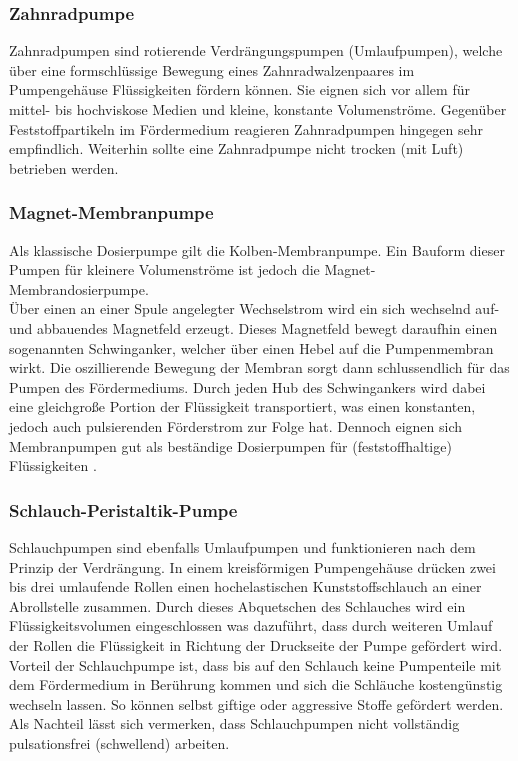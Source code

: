 \subsubsection*{Zahnradpumpe}
Zahnradpumpen sind rotierende Verdrängungspumpen (Umlaufpumpen), welche über eine formschlüssige Bewegung eines Zahnradwalzenpaares im Pumpengehäuse Flüssigkeiten fördern können. Sie eignen sich vor allem für mittel- bis hochviskose Medien und kleine, konstante Volumenströme. Gegenüber Feststoffpartikeln im Fördermedium reagieren Zahnradpumpen hingegen sehr empfindlich. Weiterhin sollte eine Zahnradpumpe nicht trocken (mit Luft) betrieben werden. \cite{Ignatowitz.2013} 

\subsubsection*{Magnet-Membranpumpe}
Als klassische Dosierpumpe gilt die Kolben-Membranpumpe. Ein Bauform dieser Pumpen für kleinere Volumenströme ist jedoch die Magnet-Membrandosierpumpe.\\ Über einen an einer Spule angelegter Wechselstrom wird ein sich wechselnd auf- und abbauendes Magnetfeld erzeugt. Dieses Magnetfeld bewegt daraufhin einen sogenannten Schwinganker, welcher über einen Hebel auf die Pumpenmembran wirkt. Die oszillierende Bewegung der Membran sorgt dann schlussendlich für das Pumpen des Fördermediums. Durch jeden Hub des Schwingankers wird dabei eine gleichgroße Portion der Flüssigkeit transportiert, was einen  konstanten, jedoch auch pulsierenden Förderstrom zur Folge hat. Dennoch eignen sich Membranpumpen gut als beständige Dosierpumpen für (feststoffhaltige) Flüssigkeiten \cite{Ignatowitz.2013,Wikipedia.2019}. 

\subsubsection*{Schlauch-Peristaltik-Pumpe}
Schlauchpumpen sind ebenfalls Umlaufpumpen und funktionieren nach dem Prinzip der Verdrängung. In einem kreisförmigen Pumpengehäuse drücken zwei bis drei umlaufende Rollen einen hochelastischen Kunststoffschlauch an einer Abrollstelle zusammen. Durch dieses Abquetschen des Schlauches wird ein Flüssigkeitsvolumen eingeschlossen was dazuführt, dass durch weiteren Umlauf der Rollen die Flüssigkeit in Richtung der Druckseite der Pumpe gefördert wird. Vorteil der Schlauchpumpe ist, dass bis auf den Schlauch keine Pumpenteile mit dem Fördermedium in Berührung kommen und sich die Schläuche kostengünstig wechseln lassen. So können selbst giftige oder aggressive Stoffe gefördert werden. Als Nachteil lässt sich vermerken, dass Schlauchpumpen nicht vollständig pulsationsfrei (schwellend) arbeiten. \cite{Ignatowitz.2013}

